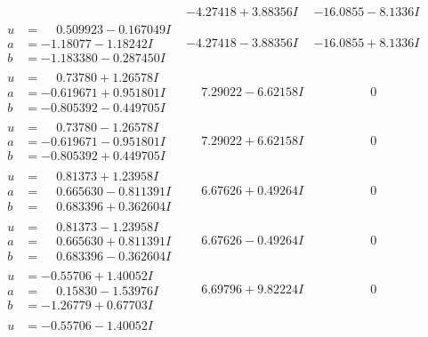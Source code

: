 \documentclass[1p]{elsarticle_modified}
\theoremstyle{definition}
\begin{document}
$$\begin{array}{c|c|c}
 & -4.27418 + 3.88356 I & -16.0855 - 8.1336 I \\ \hline\begin{aligned}
u &= \phantom{-}0.509923 - 0.167049 I \\
a &= -1.18077 - 1.18242 I \\
b &= -1.183380 - 0.287450 I\end{aligned}
 & -4.27418 - 3.88356 I & -16.0855 + 8.1336 I \\ \hline\begin{aligned}
u &= \phantom{-}0.73780 + 1.26578 I \\
a &= -0.619671 + 0.951801 I \\
b &= -0.805392 - 0.449705 I\end{aligned}
 & \phantom{-}7.29022 - 6.62158 I & \phantom{-0.000000 } 0 \\ \hline\begin{aligned}
u &= \phantom{-}0.73780 - 1.26578 I \\
a &= -0.619671 - 0.951801 I \\
b &= -0.805392 + 0.449705 I\end{aligned}
 & \phantom{-}7.29022 + 6.62158 I & \phantom{-0.000000 } 0 \\ \hline\begin{aligned}
u &= \phantom{-}0.81373 + 1.23958 I \\
a &= \phantom{-}0.665630 - 0.811391 I \\
b &= \phantom{-}0.683396 + 0.362604 I\end{aligned}
 & \phantom{-}6.67626 + 0.49264 I & \phantom{-0.000000 } 0 \\ \hline\begin{aligned}
u &= \phantom{-}0.81373 - 1.23958 I \\
a &= \phantom{-}0.665630 + 0.811391 I \\
b &= \phantom{-}0.683396 - 0.362604 I\end{aligned}
 & \phantom{-}6.67626 - 0.49264 I & \phantom{-0.000000 } 0 \\ \hline\begin{aligned}
u &= -0.55706 + 1.40052 I \\
a &= \phantom{-}0.15830 - 1.53976 I \\
b &= -1.26779 + 0.67703 I\end{aligned}
 & \phantom{-}6.69796 + 9.82224 I & \phantom{-0.000000 } 0 \\ \hline\begin{aligned}
u &= -0.55706 - 1.40052 I \\

\end{aligned}
\end{array}$$
\end{document}
